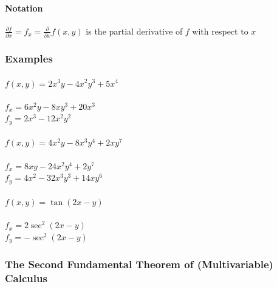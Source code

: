 \documentclass[
  letterpaper,
  DIV=11,
  numbers=noendperiod]{scrartcl}
\let\oldparagraph\paragraph
\renewcommand{\paragraph}[1]{\oldparagraph{#1}\mbox{}}
\begin{document}
\hypertarget{notation}{%
\paragraph{Notation}\label{notation}}

\(\frac{\partial f}{\partial x} = f_x = \frac{\partial}{\partial x}f(x, y)\)
is the partial derivative of \(f\) with respect to \(x\)

\hypertarget{examples-4}{%
\subsubsection{Examples}\label{examples-4}}

\hypertarget{fx-y-2x3y-4x2y35x4}{%
\paragraph{\texorpdfstring{\(f(x, y) = 2x^3y-4x^2y^3+5x^4\)}{f(x, y) = 2x\^{}3y-4x\^{}2y\^{}3+5x\^{}4}}\label{fx-y-2x3y-4x2y35x4}}

\(f_x = 6x^2y-8xy^3+20x^3\)\\
\(f_y = 2x^3-12x^2y^2\)

\hypertarget{fx-y-4x2y-8x3y42xy7}{%
\paragraph{\texorpdfstring{\(f(x, y) = 4x^2y-8x^3y^4+2xy^7\)}{f(x, y) = 4x\^{}2y-8x\^{}3y\^{}4+2xy\^{}7}}\label{fx-y-4x2y-8x3y42xy7}}

\(f_x = 8xy-24x^2y^4+2y^7\)\\
\(f_y = 4x^2-32x^3y^3+14xy^6\)

\hypertarget{fxytan2x-y}{%
\paragraph{\texorpdfstring{\(f(x,y)=\tan(2x-y)\)}{f(x,y)=\textbackslash tan(2x-y)}}\label{fxytan2x-y}}

\(f_x = 2\sec^2(2x-y)\)\\
\(f_y = -\sec^2(2x-y)\)

\hypertarget{the-second-fundamental-theorem-of-multivariable-calculus}{%
\subsubsection{The Second Fundamental Theorem of (Multivariable)
Calculus}\label{the-second-fundamental-theorem-of-multivariable-calculus}}
\end{document}

